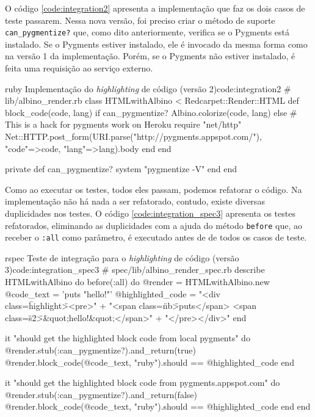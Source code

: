 O código \ref{code:integration2} apresenta a implementação que faz os dois casos de teste passarem. Nessa nova versão, foi preciso criar o método de suporte \texttt{can\_pygmentize?} que, como dito anteriormente, verifica se o Pygments está instalado. Se o Pygments estiver instalado, ele é invocado da mesma forma como na versão 1 da implementação. Porém, se o Pygments não estiver instalado, é feita uma requisição ao serviço externo.

\begin{mycode}{ruby}%
{Implementação do \textit{highlighting} de código (versão 2)}{code:integration2}
# lib/albino_render.rb
class HTMLwithAlbino < Redcarpet::Render::HTML
  def block_code(code, lang)
    if can_pygmentize?
      Albino.colorize(code, lang)
    else
      # This is a hack for pygments work on Heroku
      require "net/http"
      Net::HTTP.post_form(URI.parse("http://pygments.appspot.com/"),
                          {"code"=>code, "lang"=>lang}).body
    end
  end

  private
  def can_pygmentize?
    system "pygmentize -V"
  end
end
\end{mycode}

Como ao executar os testes, todos eles passam, podemos refatorar o código. Na implementação não há nada a ser refatorado, contudo, existe diversas duplicidades nos testes. O código \ref{code:integration_spec3} apresenta os testes refatorados, eliminando as duplicidades com a ajuda do método \texttt{before} que, ao receber o \texttt{:all} como parâmetro, é executado antes de de todos os casos de teste.

\begin{mycode}{rspec}%
{Teste de integração para o \textit{highlighting} de código (versão 3)}{code:integration_spec3}
# spec/lib/albino_render_spec.rb
describe HTMLwithAlbino do
  before(:all) do
    @render = HTMLwithAlbino.new
    @code_text = 'puts "hello!"'
    @highlighted_code =
      "<div class=\"highlight\"><pre>" +
        "<span class=\"nb\">puts</span> <span class=\"s2\">&quot;hello!&quot;</span>\n" +
      "</pre>\n</div>\n"
  end

  it "should get the highlighted block code from local pygments" do
    @render.stub(:can_pygmentize?).and_return(true)
    @render.block_code(@code_text, "ruby").should == @highlighted_code
  end

  it "should get the highlighted block code from pygments.appspot.com" do
    @render.stub(:can_pygmentize?).and_return(false)
    @render.block_code(@code_text, "ruby").should == @highlighted_code
  end
end
\end{mycode}

